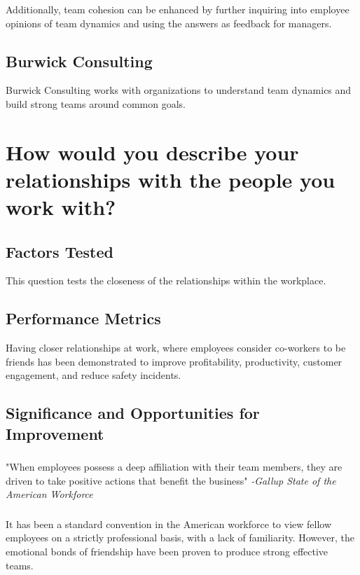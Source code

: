 \documentclass[14pt]{extreport}
\begin{document}
\subsubsection*{}
Additionally, team cohesion can be enhanced by further inquiring into employee opinions of team dynamics and using the answers as feedback for managers.

\subsection*{\centering Burwick Consulting}
Burwick Consulting works with organizations to understand team dynamics and build strong teams around common goals.

\newpage
\section*{How would you describe your relationships with the people you work with?}

\subsection*{\centering Factors Tested}
This question tests the closeness of the relationships within the
workplace.
\subsection*{\centering Performance Metrics}
Having closer relationships at work, where employees consider
co-workers to be friends has been demonstrated to improve
profitability, productivity, customer engagement, and reduce
safety incidents.

\subsection*{\centering Significance and Opportunities for Improvement}
\subsubsection*{}
"When employees possess a deep affiliation with their team
members, they are driven to take positive actions that benefit the business"
\textit{-Gallup State of the American Workforce}
\subsubsection*{}
It has been a standard convention in the American workforce to
view fellow employees on a strictly professional basis, with a lack
of familiarity. However, the emotional bonds of friendship have
been proven to produce strong effective teams.
\end{document}
